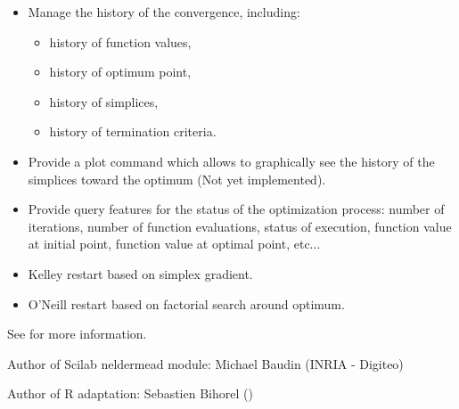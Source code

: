 \begin{Description}
\begin{itemize}
\begin{itemize}
\end{itemize}

\item Manage the history of the convergence, including: \begin{itemize}

\item history of function values,
\item history of optimum point,
\item history of simplices,
\item history of termination criteria.

\end{itemize}

\item Provide a plot command which allows to graphically see the history
of the simplices toward the optimum (Not yet implemented).
\item Provide query features for the status of the optimization process:
number of iterations, number of function evaluations, status of execution,
function value at initial point, function value at optimal point, etc...
\item Kelley restart based on simplex gradient.
\item O'Neill restart based on factorial search around optimum.

\end{itemize}

\end{Description}
%
\begin{Details}\relax

See  for more information.
\end{Details}
%
\begin{Author}\relax
Author of Scilab neldermead module: Michael Baudin (INRIA - Digiteo)

Author of R adaptation: Sebastien Bihorel ()
\end{Author}
%
